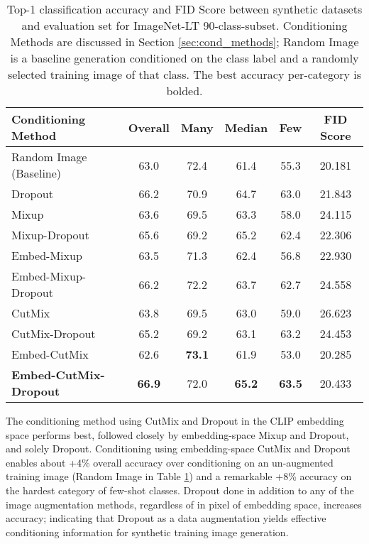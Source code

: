 \begin{table}[ht]
\centering
\small
\vspace{-0.3cm}
\caption{Top-1 classification accuracy and FID Score between synthetic datasets and evaluation set for ImageNet-LT  90-class-subset. Conditioning Methods are discussed in Section \ref{sec:cond_methods}; Random Image is a baseline generation conditioned on the class label and a randomly selected training image of that class. The best accuracy per-category is bolded.}
\vspace{0.2cm}
\begin{tabular}{lcccc|c}
\toprule
\textbf{Conditioning Method} & \textbf{Overall} & \textbf{Many} & \textbf{Median} & \textbf{Few} & \textbf{FID Score}\\
\midrule
\midrule
Random Image (Baseline) & 63.0 & 72.4 & 61.4 & 55.3 & 20.181\\
Dropout & 66.2 & 70.9 & 64.7 & 63.0 & 21.843 \\
Mixup & 63.6 & 69.5 & 63.3 & 58.0 & 24.115 \\ 
Mixup-Dropout & 65.6 & 69.2 & 65.2 & 62.4 & 22.306 \\
Embed-Mixup & 63.5 & 71.3 & 62.4 & 56.8 & 22.930 \\ 
Embed-Mixup-Dropout & 66.2 & 72.2 & 63.7 & 62.7 & 24.558 \\ 
CutMix & 63.8 & 69.5 & 63.0 & 59.0 & 26.623 \\
CutMix-Dropout & 65.2 & 69.2 & 63.1 & 63.2 & 24.453 \\
Embed-CutMix & 62.6 & \textbf{73.1} & 61.9 & 53.0 & 20.285 \\
\textbf{Embed-CutMix-Dropout} & \textbf{66.9} & 72.0 & \textbf{65.2} & \textbf{63.5} & 20.433 \\
\bottomrule
\end{tabular}
\label{table:90}
\vspace{-0.3cm}
\end{table} 

The conditioning method using CutMix and Dropout in the CLIP embedding space performs best, followed closely by embedding-space Mixup and Dropout, and solely Dropout. 
Conditioning using embedding-space CutMix and Dropout enables about +4\% overall accuracy over conditioning on an un-augmented training image (Random Image in Table \ref{table:90}) and a remarkable +8\% accuracy on the hardest category of few-shot classes.
Dropout done in addition to any of the image augmentation methods, regardless of in pixel of embedding space, increases accuracy; indicating that Dropout as a data augmentation yields effective conditioning information for synthetic training image generation.

